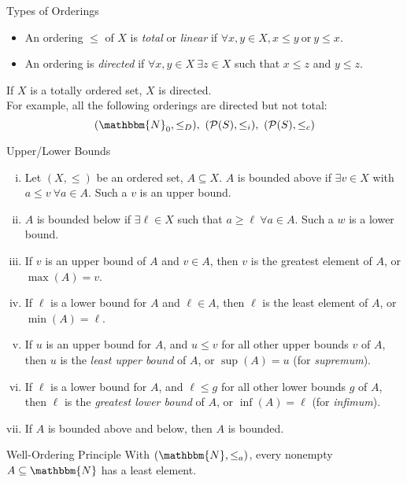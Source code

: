 \documentclass[10pt]{extarticle}
\newcommand{\N}{\mathbbm{N}}
\begin{document}
  \begin{problem}{Types of Orderings}
    \begin{itemize}
      \item An ordering $\leq$ of $X$ is \textsl{total} or \textit{linear} if $\forall x,y\in X, x\leq y~\text{or}~y\leq x$. 
      \item An ordering is \textsl{directed} if $\forall x,y\in X~\exists z\in X$ such that $x\leq z$ and $y\leq z$.
    \end{itemize}
    If $X$ is a totally ordered set, $X$ is directed.\\

    For example, all the following orderings are directed but not total:
    \[
      (\N_0,\leq_D),~(\mathcal{P}(S),\leq_i),~(\mathcal{P}(S),\leq_c)
    \] 
  \end{problem}
  \begin{problem}{Upper/Lower Bounds}
    \begin{enumerate}[(i)]
      \item Let $(X,\leq)$ be an ordered set, $A\subseteq X$. $A$ is bounded above if $\exists v\in X$ with $a\leq v~\forall a\in A$. Such a $v$ is an upper bound.
      \item $A$ is bounded below if $\exists \ell\in X$ such that $a\geq \ell~\forall a\in A$. Such a $w$ is a lower bound.
      \item If $v$ is an upper bound of $A$ and $v\in A$, then $v$ is the greatest element of $A$, or $\max(A) = v$.
      \item If $\ell$ is a lower bound for $A$ and $\ell\in A$, then $\ell$ is the least element of $A$, or $\min(A) = \ell$.
      \item If $u$ is an upper bound for $A$, and $u \leq v$ for all other upper bounds $v$ of $A$, then $u$ is the \textsl{least upper bound} of $A$, or $\sup(A) = u$ (for \textit{supremum}).
      \item If $\ell$ is a lower bound for $A$, and $\ell \leq g$ for all other lower bounds $g$ of $A$, then $\ell$ is the \textsl{greatest lower bound} of $A$, or $\inf(A) = \ell$ (for \textit{infimum}).
      \item If $A$ is bounded above and below, then $A$ is bounded.
    \end{enumerate}
  \end{problem}
  \begin{problem}{Well-Ordering Principle}
    With $(\N,\leq_a)$, every nonempty $A\subseteq \N$ has a least element.
  \end{problem}
\end{document}
